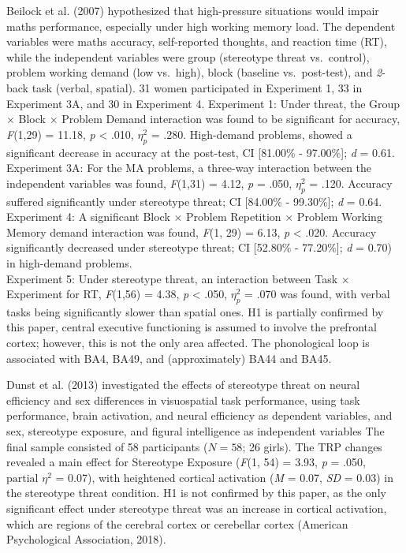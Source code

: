 \documentclass[
  stu, a4paper,floatsintext]{apa7}
\begin{document}
Beilock et al. (2007) hypothesized that high-pressure situations would impair maths performance, especially under high working memory load.
The dependent variables were maths accuracy, self-reported thoughts, and reaction time (RT), while the independent variables were group (stereotype threat vs.~control), problem working demand (low vs.~high), block (baseline vs.~post-test), and \emph{2}-back task (verbal, spatial).
31 women participated in Experiment 1, 33 in Experiment 3A, and 30 in Experiment 4.
Experiment 1: Under threat, the Group \(\times\) Block \(\times\) Problem Demand interaction was found to be significant for accuracy, \emph{F}(1,29) = 11.18, \emph{p} \textless{} .010, \(\eta^{2}_{p}\) = .280.
High-demand problems, showed a significant decrease in accuracy at the post-test, CI {[}81.00\% - 97.00\%{]}; \emph{d} = 0.61.\\
Experiment 3A: For the MA problems, a three-way interaction between the independent variables was found, \emph{F}(1,31) = 4.12, \emph{p} = .050, \(\eta^{2}_{p}\) = .120.
Accuracy suffered significantly under stereotype threat; CI {[}84.00\% - 99.30\%{]}; \emph{d} = 0.64.\\
Experiment 4: A significant Block \(\times\) Problem Repetition \(\times\) Problem Working Memory demand interaction was found, \emph{F}(1, 29) = 6.13, \emph{p} \textless{} .020.
Accuracy significantly decreased under stereotype threat; CI {[}52.80\% - 77.20\%{]}; \emph{d} = 0.70) in high-demand problems.\\
Experiment 5: Under stereotype threat, an interaction between Task \(\times\) Experiment for RT, \emph{F}(1,56) = 4.38, \emph{p} \textless{} .050, \(\eta^{2}_{p}\) = .070 was found, with verbal tasks being significantly slower than spatial ones.
H1 is partially confirmed by this paper, central executive functioning is assumed to involve the prefrontal cortex; however, this is not the only area affected.
The phonological loop is associated with BA4, BA49, and (approximately) BA44 and BA45.

Dunst et al. (2013) investigated the effects of stereotype threat on neural efficiency and sex differences in visuospatial task performance, using task performance, brain activation, and neural efficiency as dependent variables, and sex, stereotype exposure, and figural intelligence as independent variables
The final sample consisted of 58 participants (\(N = 58\); 26 girls).
The TRP changes revealed a main effect for Stereotype Exposure (\emph{F}(1, 54) = 3.93, \emph{p} = .050, \(\text{partial }\eta^{2}\) = 0.07), with heightened cortical activation (\emph{M} = 0.07, \emph{SD} = 0.03) in the stereotype threat condition.
H1 is not confirmed by this paper, as the only significant effect under stereotype threat was an increase in cortical activation, which are regions of the cerebral cortex or cerebellar cortex (American Psychological Association, 2018).
\end{document}
